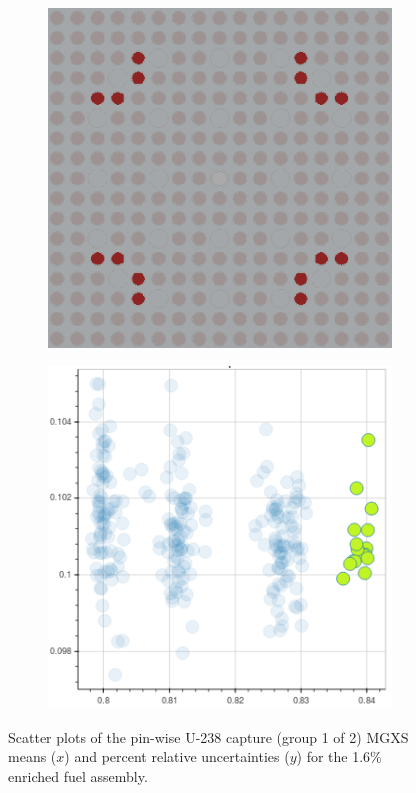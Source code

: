 \begin{figure}[h!]
\begin{subfigure}{0.45\textwidth}
  \caption{}
  \label{fig:chap10-capt-mean-std-mgxs-4}
\end{subfigure}
\begin{subfigure}{0.45\textwidth}
  \centering
  \includegraphics[width=0.9\linewidth]{figures/unsupervised/features/assm-16/u238-capt/mean-std/geometry-3}
  \caption{}
  \label{fig:chap10-capt-mean-std-geom-5}
\end{subfigure}%
\begin{subfigure}{0.45\textwidth}
  \centering
  \includegraphics[width=0.9\linewidth]{figures/unsupervised/features/assm-16/u238-capt/mean-std/mgxs-3}
  \caption{}
  \label{fig:chap10-capt-mean-std-mgxs-5}
\end{subfigure}
\caption[Clustering of U-238 capture MGXS standard deviations]{Scatter plots of the pin-wise U-238 capture (group 1 of 2) \ac{MGXS} means ($x$) and percent relative uncertainties ($y$) for the 1.6\% enriched fuel assembly.}
\label{fig:chap10-capt-mean-std-2}
\end{figure}

